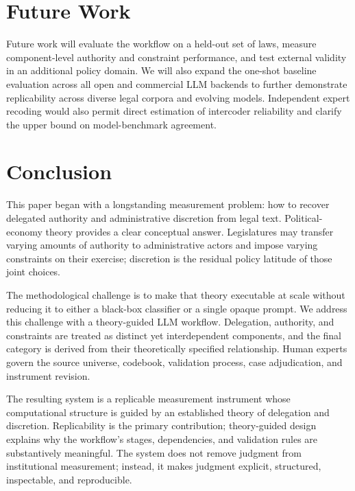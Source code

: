 \documentclass[conference]{IEEEtran}
\begin{document}
\section{Future Work}

Future work will evaluate the workflow on a held-out set of laws, measure component-level authority and constraint performance, and test external validity in an additional policy domain. We will also expand the one-shot baseline evaluation across all open and commercial LLM backends to further demonstrate replicability across diverse legal corpora and evolving models. Independent expert recoding would also permit direct estimation of intercoder reliability and clarify the upper bound on model-benchmark agreement.


\section{Conclusion}

This paper began with a longstanding measurement problem: how to recover delegated authority and administrative discretion from legal text. Political-economy theory provides a clear conceptual answer. Legislatures may transfer varying amounts of authority to administrative actors and impose varying constraints on their exercise; discretion is the residual policy latitude of those joint choices.

The methodological challenge is to make that theory executable at scale without reducing it to either a black-box classifier or a single opaque prompt. We address this challenge with a theory-guided LLM workflow. Delegation, authority, and constraints are treated as distinct yet interdependent components, and the final category is derived from their theoretically specified relationship. Human experts govern the source universe, codebook, validation process, case adjudication, and instrument revision.

The resulting system is a replicable measurement instrument whose computational structure is guided by an established theory of delegation and discretion. Replicability is the primary contribution; theory-guided design explains why the workflow's stages, dependencies, and validation rules are substantively meaningful. The system does not remove judgment from institutional measurement; instead, it makes judgment explicit, structured, inspectable, and reproducible.



\end{document}
